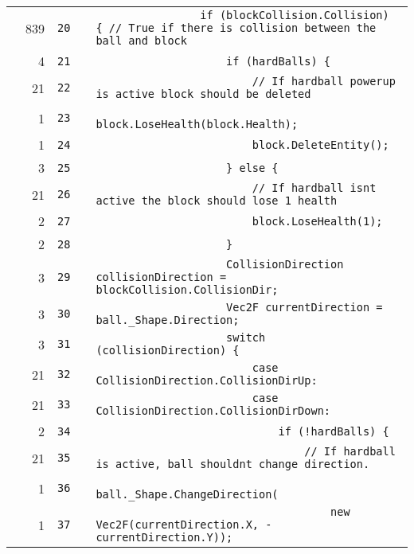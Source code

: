 \documentclass[a4paper,landscape,10pt]{article}
\begin{document}
\begin{longtable}[l]{lrrll}
\cellcolor{green} & 839 & \verb~20~ & & \verb~                if (blockCollision.Collision) { // True if there is collision between the ball and block~\\
\cellcolor{green} & 4 & \verb~21~ & & \verb~                    if (hardBalls) {~\\
\cellcolor{green} & 21 & \verb~22~ & & \verb~                        // If hardball powerup is active block should be deleted~\\
\cellcolor{green} & 1 & \verb~23~ & & \verb~                        block.LoseHealth(block.Health);~\\
\cellcolor{green} & 1 & \verb~24~ & & \verb~                        block.DeleteEntity();~\\
\cellcolor{green} & 3 & \verb~25~ & & \verb~                    } else {~\\
\cellcolor{green} & 21 & \verb~26~ & & \verb~                        // If hardball isnt active the block should lose 1 health~\\
\cellcolor{green} & 2 & \verb~27~ & & \verb~                        block.LoseHealth(1);~\\
\cellcolor{green} & 2 & \verb~28~ & & \verb~                    }~\\
\cellcolor{green} & 3 & \verb~29~ & & \verb~                    CollisionDirection collisionDirection = blockCollision.CollisionDir;~\\
\cellcolor{green} & 3 & \verb~30~ & & \verb~                    Vec2F currentDirection = ball._Shape.Direction;~\\
\cellcolor{green} & 3 & \verb~31~ & & \verb~                    switch (collisionDirection) {~\\
\cellcolor{green} & 21 & \verb~32~ & & \verb~                        case CollisionDirection.CollisionDirUp:~\\
\cellcolor{green} & 21 & \verb~33~ & & \verb~                        case CollisionDirection.CollisionDirDown:~\\
\cellcolor{green} & 2 & \verb~34~ & & \verb~                            if (!hardBalls) {~\\
\cellcolor{green} & 21 & \verb~35~ & & \verb~                                // If hardball is active, ball shouldnt change direction.~\\
\cellcolor{green} & 1 & \verb~36~ & & \verb~                                ball._Shape.ChangeDirection(~\\
\cellcolor{green} & 1 & \verb~37~ & & \verb~                                    new Vec2F(currentDirection.X, -currentDirection.Y));~\\

\end{longtable}
\end{document}
